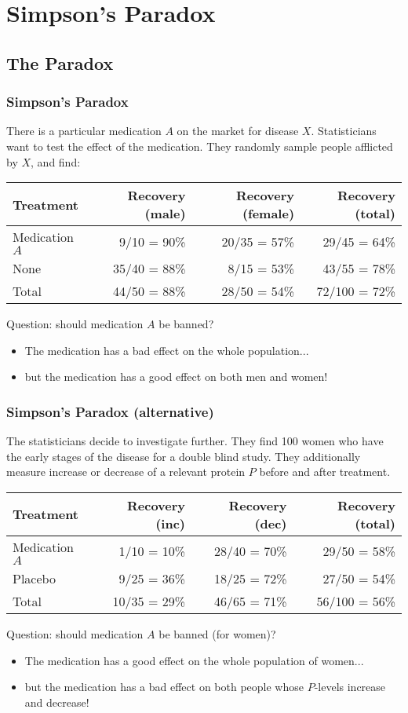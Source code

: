 \documentclass{beamer}
\begin{document}
\section{Simpson's Paradox}
\subsection{The Paradox}
\begin{frame}
    \frametitle{Simpson's Paradox}
    There is a particular medication $A$ on the market for disease $X$.
Statisticians want to test the effect of the medication. They randomly sample
people afflicted by $X$, and find:
{\small
\begin{center}
    \begin{tabular}{l|rr:r}
        Treatment & Recovery (male) & Recovery (female) & Recovery (total)\\
        \hline
        Medication $A$ & 9/10 = 90\%& 20/35 = 57\%& 29/45 = 64\% \\
        None           & 35/40 = 88\%& 8/15 = 53\%& 43/55 = 78\%\\
        \hdashline
        Total & 44/50 = 88\%& 28/50 = 54\%& 72/100 = 72\%
    \end{tabular}
\end{center}
}
\pause
\alert{Question}: should medication $A$ be banned?
\pause
\begin{itemize}
    \item The medication has a bad effect on the whole population...\pause
    \item but the medication has a good effect on both men and women!
\end{itemize}
\end{frame}

\begin{frame}
    \frametitle{Simpson's Paradox (alternative)}
    The statisticians decide to investigate further. They find 100 women who
have the early stages of the disease for a double blind study. They
additionally measure increase or decrease of a relevant protein $P$ before and after
treatment. 
{\small
\begin{center}
    \begin{tabular}{l|rr:r}
        Treatment & Recovery (inc) & Recovery (dec) & Recovery (total)\\
        \hline
        Medication $A$ &  1/10 = 10\%& 28/40 = 70\%& 29/50 = 58\%\\
        Placebo        &  9/25 = 36\%& 18/25 = 72\%& 27/50 = 54\%\\
        \hdashline
        Total          & 10/35 = 29\%& 46/65 = 71\%& 56/100 = 56\%
    \end{tabular}
\end{center}
}
\pause
\alert{Question}: should medication $A$ be banned (for women)?
\pause
\begin{itemize}
    \item The medication has a good effect on the whole population of women...\pause
    \item but the medication has a bad effect on both people whose $P$-levels
increase and decrease!
\end{itemize}
\end{frame}
\end{document}
